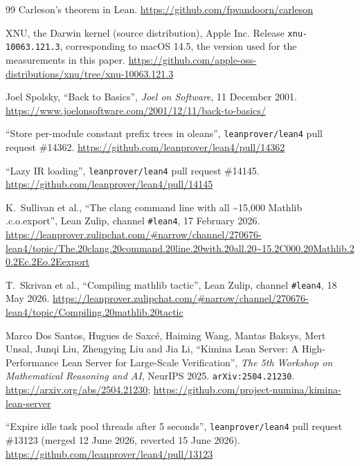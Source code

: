 \documentclass{article}
\begin{document}
\begin{thebibliography}{99}
 Carleson's theorem in Lean.
\url{https://github.com/fpvandoorn/carleson}

 XNU, the Darwin kernel (source distribution), Apple Inc. Release \texttt{xnu-10063.121.3}, corresponding to macOS 14.5, the version used for the measurements in this paper.
\url{https://github.com/apple-oss-distributions/xnu/tree/xnu-10063.121.3}

 Joel Spolsky, ``Back to Basics'', \emph{Joel on Software}, 11 December 2001.
\url{https://www.joelonsoftware.com/2001/12/11/back-to-basics/}

 ``Store per-module constant prefix trees in oleans'', \texttt{leanprover/lean4} pull request \#14362.
\url{https://github.com/leanprover/lean4/pull/14362}

 ``Lazy IR loading'', \texttt{leanprover/lean4} pull request \#14145.
\url{https://github.com/leanprover/lean4/pull/14145}

 K.~Sullivan et al., ``The clang command line with all \textasciitilde15,000 Mathlib .c.o.export'', Lean Zulip, channel \texttt{\#lean4}, 17 February 2026.
\url{https://leanprover.zulipchat.com/#narrow/channel/270676-lean4/topic/The.20clang.20command.20line.20with.20all.20~15.2C000.20Mathlib.20.2Ec.2Eo.2Eexport}

 T.~Skrivan et al., ``Compiling mathlib tactic'', Lean Zulip, channel \texttt{\#lean4}, 18 May 2026.
\url{https://leanprover.zulipchat.com/#narrow/channel/270676-lean4/topic/Compiling.20mathlib.20tactic}

 Marco Dos Santos, Hugues de Saxc\'e, Haiming Wang, Mantas Baksys, Mert Unsal, Junqi Liu, Zhengying Liu and Jia Li, ``Kimina Lean Server: A High-Performance Lean Server for Large-Scale Verification'', \emph{The 5th Workshop on Mathematical Reasoning and AI}, NeurIPS 2025. \texttt{arXiv:2504.21230}. \url{https://arxiv.org/abs/2504.21230}; \url{https://github.com/project-numina/kimina-lean-server}

 ``Expire idle task pool threads after 5 seconds'', \texttt{leanprover/lean4} pull request \#13123 (merged 12 June 2026, reverted 15 June 2026).
\url{https://github.com/leanprover/lean4/pull/13123}

\end{thebibliography}
\end{document}
